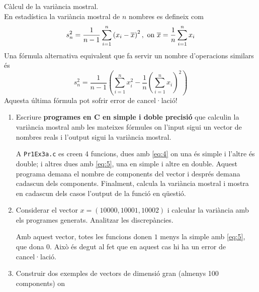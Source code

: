 \documentclass[a4paper, 12pt]{article}
\begin{document}
    \begin{exercici}
        Càlcul de la variància mostral.\\
        En estadística la variància mostral de $n$ nombres es defineix com
        \begin{equation}
            s^2_n = \frac{1}{n-1}\sum\limits_{i=1}^n\left(x_i-\overline{x}\right)^2,\hbox{ on } \overline{x} = \frac{1}{n}\sum\limits_{i=1}^n x_i
            \label{eq:4}
        \end{equation}
        Una fórmula alternativa equivalent que fa servir un nombre d'operacions similars és
        \begin{equation}
            s^2_n = \frac{1}{n-1}\left(\sum\limits_{i=1}^{n} x^2_i - \frac{1}{n}\left(\sum\limits_{i=1}^{n}x_i\right)^2\right)
            \label{eq:5}
        \end{equation}
        Aquesta última fórmula pot sofrir error de cancel·lació!
        \begin{enumerate}[label=\alph*)]
            \item Escriure \textbf{programes en C en simple i doble precisió} que calculin la
            variància mostral amb les mateixes fórmules on l'input sigui un vector de nombres reals
            i l'output sigui la variància mostral.\\
            \begin{solucio}
                A \verb|Pr1Ex3a.c| es creen 4 funcions, dues amb \eqref{eq:4} on una és simple i
                l'altre és double; i altres dues amb \eqref{eq:5}, una en simple i altre en double.
                Aquest programa demana el nombre de components del vector i després demana cadascun 
                dels components. Finalment, calcula la variància mostral i mostra en cadascun dels
                casos l'output de la funció en qüestió.
            \end{solucio}
            \item Considerar el vector $x = \left(10000, 10001, 10002\right)$ i calcular la
            variància amb els programes generats. Analitzar les discrepàncies.\\
            \begin{solucio}
                Amb aquest vector, totes les funcions donen $1$ menys la simple amb \eqref{eq:5},
                que dona $0$. Això és degut al fet que en aquest cas hi ha un error de cancel·lació.
            \end{solucio}
            \item Construir dos exemples de vectors de dimensió gran (almenys 100 components) on

\end{enumerate}
\end{exercici}
\end{document}
